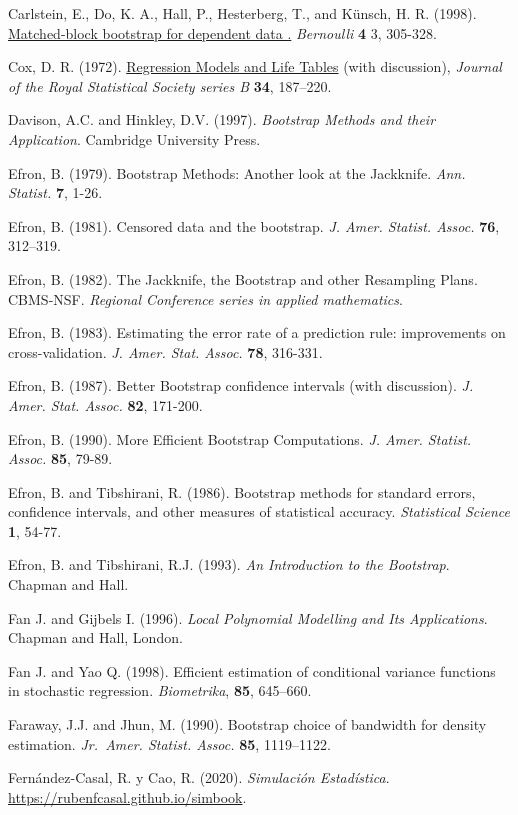 \documentclass[
]{book}
\theoremstyle{break}
\theoremstyle{definition}
\theoremstyle{definition}
\theoremstyle{definition}
\theoremstyle{remark}
\begin{document}
Carlstein, E., Do, K. A., Hall, P., Hesterberg, T., and Künsch, H. R. (1998). \href{https://projecteuclid.org/euclid.bj/1174324983}{Matched-block bootstrap for dependent data .}
\emph{Bernoulli} \textbf{4} 3, 305-328.

Cox, D. R. (1972). \href{https://rss.onlinelibrary.wiley.com/doi/abs/10.1111/j.2517-6161.1972.tb00899.x}{Regression Models and Life Tables}
(with discussion), \emph{Journal of the Royal Statistical Society series B} \textbf{34}, 187--220.

Davison, A.C. and Hinkley, D.V. (1997).
\emph{Bootstrap Methods and their Application}. Cambridge University Press.

Efron, B. (1979). Bootstrap Methods: Another look at the Jackknife.
\emph{Ann. Statist.} \textbf{7}, 1-26.

Efron, B. (1981). Censored data and the bootstrap.
\emph{J. Amer. Statist. Assoc.} \textbf{76}, 312--319.

Efron, B. (1982). The Jackknife, the Bootstrap and other Resampling
Plans. CBMS-NSF. \emph{Regional Conference series in applied mathematics}.

Efron, B. (1983). Estimating the error rate of a prediction rule:
improvements on cross-validation. \emph{J. Amer. Stat. Assoc.} \textbf{78}, 316-331.

Efron, B. (1987). Better Bootstrap confidence intervals (with
discussion). \emph{J. Amer. Stat. Assoc.} \textbf{82}, 171-200.

Efron, B. (1990). More Efficient Bootstrap Computations.
\emph{J. Amer. Statist. Assoc.} \textbf{85}, 79-89.

Efron, B. and Tibshirani, R. (1986). Bootstrap methods for standard
errors, confidence intervals, and other measures of statistical
accuracy. \emph{Statistical Science} \textbf{1}, 54-77.

Efron, B. and Tibshirani, R.J. (1993). \emph{An Introduction to the Bootstrap}.
Chapman and Hall.

Fan J. and Gijbels I. (1996). \emph{Local Polynomial Modelling and Its Applications}.
Chapman and Hall, London.

Fan J. and Yao Q. (1998). Efficient estimation of conditional variance functions in
stochastic regression. \emph{Biometrika}, \textbf{85}, 645--660.

Faraway, J.J. and Jhun, M. (1990). Bootstrap choice of bandwidth for
density estimation. \emph{Jr.~Amer. Statist. Assoc.} \textbf{85}, 1119--1122.

Fernández-Casal, R. y Cao, R. (2020). \emph{Simulación Estadística}. \url{https://rubenfcasal.github.io/simbook}.
\end{document}
